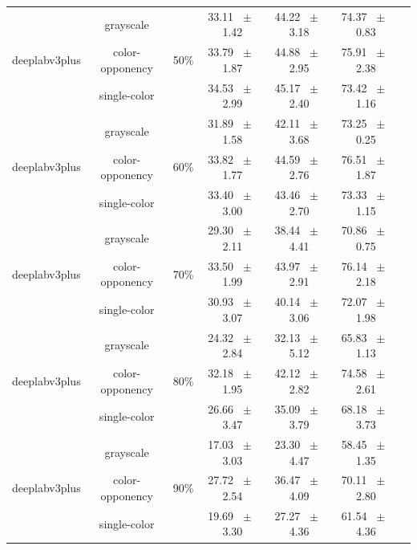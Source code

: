 \begin{table}[h]
\begin{tabular}{@{}lccc ccc@{}}
    \midrule
    \multirow{3}{*}{deeplabv3plus} & grayscale & \multirow{3}{*}{50\%} & 33.11 ~$\pm$~ 1.42 & 44.22 ~$\pm$~ 3.18 & 74.37 ~$\pm$~ 0.83 \\
    & color-opponency &  & 33.79 ~$\pm$~ 1.87 & 44.88 ~$\pm$~ 2.95 & 75.91 ~$\pm$~ 2.38 \\
    & single-color &  & 34.53 ~$\pm$~ 2.99 & 45.17 ~$\pm$~ 2.40 & 73.42 ~$\pm$~ 1.16 \\
    \midrule
    \multirow{3}{*}{deeplabv3plus} & grayscale & \multirow{3}{*}{60\%} & 31.89 ~$\pm$~ 1.58 & 42.11 ~$\pm$~ 3.68 & 73.25 ~$\pm$~ 0.25 \\
    & color-opponency &  & 33.82 ~$\pm$~ 1.77 & 44.59 ~$\pm$~ 2.76 & 76.51 ~$\pm$~ 1.87 \\
    & single-color &  & 33.40 ~$\pm$~ 3.00 & 43.46 ~$\pm$~ 2.70 & 73.33 ~$\pm$~ 1.15 \\
    \midrule
    \multirow{3}{*}{deeplabv3plus} & grayscale & \multirow{3}{*}{70\%} & 29.30 ~$\pm$~ 2.11 & 38.44 ~$\pm$~ 4.41 & 70.86 ~$\pm$~ 0.75 \\
    & color-opponency &  & 33.50 ~$\pm$~ 1.99 & 43.97 ~$\pm$~ 2.91 & 76.14 ~$\pm$~ 2.18 \\
    & single-color &  & 30.93 ~$\pm$~ 3.07 & 40.14 ~$\pm$~ 3.06 & 72.07 ~$\pm$~ 1.98 \\
    \midrule
    \multirow{3}{*}{deeplabv3plus} & grayscale & \multirow{3}{*}{80\%} & 24.32 ~$\pm$~ 2.84 & 32.13 ~$\pm$~ 5.12 & 65.83 ~$\pm$~ 1.13 \\
    & color-opponency &  & 32.18 ~$\pm$~ 1.95 & 42.12 ~$\pm$~ 2.82 & 74.58 ~$\pm$~ 2.61 \\
    & single-color &  & 26.66 ~$\pm$~ 3.47 & 35.09 ~$\pm$~ 3.79 & 68.18 ~$\pm$~ 3.73 \\
    \midrule
    \multirow{3}{*}{deeplabv3plus} & grayscale & \multirow{3}{*}{90\%} & 17.03 ~$\pm$~ 3.03 & 23.30 ~$\pm$~ 4.47 & 58.45 ~$\pm$~ 1.35 \\
    & color-opponency &  & 27.72 ~$\pm$~ 2.54 & 36.47 ~$\pm$~ 4.09 & 70.11 ~$\pm$~ 2.80 \\
    & single-color &  & 19.69 ~$\pm$~ 3.30 & 27.27 ~$\pm$~ 4.36 & 61.54 ~$\pm$~ 4.36 \\
    \midrule
    \bottomrule
  \end{tabular}
  \label{tab:sparse_results_deeplabv3plus_acdc_full}
\end{table}